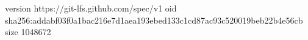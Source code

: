 version https://git-lfs.github.com/spec/v1
oid sha256:addabf03f0a1bac216e7d1aea193ebed133c1cd87ac93c520019beb22b4e56cb
size 1048672
